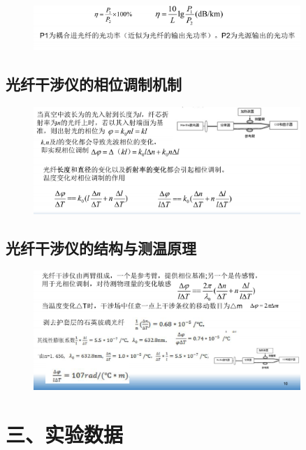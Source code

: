 \documentclass{article}
\begin{document}
\begin{figure}[H]
    \centering
    \includegraphics[width=0.9\textwidth]{p4.png}
    \end{figure}

\subsection*{光纤干涉仪的相位调制机制}
\begin{figure}[H]
    \centering
    \includegraphics[width=0.9\textwidth]{p5.png}
    \end{figure}

\subsection*{光纤干涉仪的结构与测温原理}
\begin{figure}[H]
    \centering
    \includegraphics[width=0.9\textwidth]{p6.png}
    \end{figure}

\section*{三、实验数据}
\end{document}
